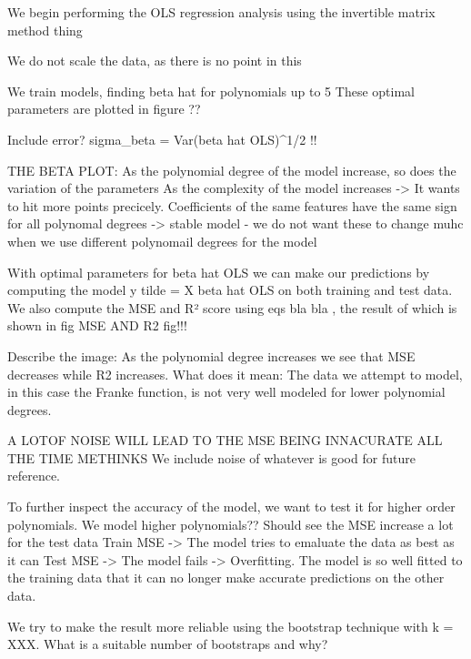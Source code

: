\documentclass[reprint,english,notitlepage]{revtex4-1}  %
\begin{document}




We begin performing the OLS regression analysis using the invertible matrix method thing 

We do not scale the data, as there is no point in this 

We train models, finding beta hat for polynomials up to 5 
These optimal parameters are plotted in figure ?? 

Include error? sigma_beta = Var(beta hat OLS)^1/2 !! 

THE BETA PLOT: 
As the polynomial degree of the model increase, so does the variation of the parameters 
As the complexity of the model increases -> It wants to hit more points precicely. 
Coefficients of the same features have the same sign for all polynomal degrees -> stable model - we do not want these to change muhc when we use different polynomail degrees for the model 

With optimal parameters for beta hat OLS we can make our predictions by computing the model y tilde = X beta hat OLS on both training and test data. We also compute the MSE and R² score using eqs bla bla , the result of which is shown in fig MSE AND R2 fig!!! 

Describe the image: As the polynomial degree increases we see that MSE decreases while R2 increases. 
What does it mean: The data we attempt to model, in this case the Franke function, is not very well modeled for lower polynomial degrees. 

A LOTOF NOISE WILL LEAD TO THE MSE BEING INNACURATE ALL THE TIME METHINKS 
We include noise of whatever is good for future reference. 

To further inspect the accuracy of the model, we want to test it for higher order polynomials. 
We model higher polynomials?? Should see the MSE increase a lot for the test data 
Train MSE -> The model tries to emaluate the data as best as it can 
Test MSE -> The model fails -> Overfitting. The model is so well fitted to the training data that it can no longer make accurate predictions on the other data. 

We try to make the result more reliable using the bootstrap technique with k = XXX. What is a suitable number of bootstraps and why? 
\end{document}
